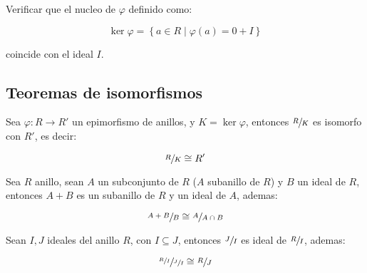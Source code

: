         \begin{ejercicio}
            Verificar que el nucleo de $\varphi$ definido como:

            \begin{equation*}
                \ker{\varphi} = \left\{ a \in R \mid \varphi(a) = 0 + I \right\}
            \end{equation*}

            coincide con el ideal $I$.
        \end{ejercicio}

    \newpage
    \subsection{Teoremas de isomorfismos}

        \begin{teorema}
            Sea $\varphi \colon R \to R'$ un epimorfismo de anillos, y $K = \ker{\varphi}$, entonces $\sfrac{R}{K}$ es isomorfo con $R'$, es decir:

            \begin{equation}
                \sfrac{R}{K} \cong R'
            \end{equation}
        \end{teorema}

        \begin{teorema}
            Sea $R$ anillo, sean $A$ un subconjunto de $R$ ($A$ subanillo de $R$) y $B$ un ideal de $R$, entonces $A + B$ es un subanillo de $R$ y un ideal de $A$, ademas:

            \begin{equation}
                \sfrac{A + B}{B} \cong \sfrac{A}{A \cap B}
            \end{equation}
        \end{teorema}

        \begin{teorema}
            Sean $I, J$ ideales del anillo $R$, con $I \subseteq J$, entonces $\sfrac{J}{I}$ es ideal de $\sfrac{R}{I}$, ademas:

            \begin{equation}
                \sfrac{\sfrac{R}{I}}{\sfrac{J}{I}} \cong \sfrac{R}{J}
            \end{equation}
        \end{teorema}

